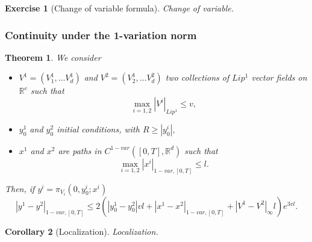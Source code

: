 \documentclass{article}
\newcommand{\R}{\mathbb{R}}
\newtheorem{theorem}{Theorem}
\newtheorem{exercise}{Exercise}
\newtheorem{corollary}[theorem]{Corollary}
\begin{document}
\begin{exercise}[Change of variable formula]
    Change of variable.
\end{exercise}

\subsubsection{Continuity under the 1-variation norm}

\begin{theorem}
    We consider
    \begin{itemize}
        \item $V^1 = (V_1^1, \ldots V^1_d)$ and $V^2 = (V_2^1, \ldots V^2_d)$ two collections of $Lip^1$ vector fields on $\R^e$ such that
        \begin{equation}
            \max_{i=1,2} |V^i|_{Lip^1} \leq v,
        \end{equation}
        \item $y_0^1$ and $y_0^2$ initial conditions, with $R \geq |y_0^i|,$
        \item $x^1$ and $x^2$ are paths in $C^{1-var}([0,T], \R^d)$ such that 
        \begin{equation}
            \max_{i=1,2} |x^i|_{1-var, [0,T]} \leq l.
        \end{equation} 
    \end{itemize}

    Then, if $y^i = \pi_{V_i}(0, y_0^i; x^i)$
    \begin{equation}
        |y^1 - y^2|_{1-var,[0,T]} \leq 2 \left( |y_0^1 - y_0^2| v l + |x^1 - x^2|_{1-var,[0,T]} + |V^1 - V^2|_\infty l \right) e^{3vl}.
    \end{equation}
\end{theorem}

\begin{corollary}[Localization]
    Localization.
\end{corollary}
\end{document}
